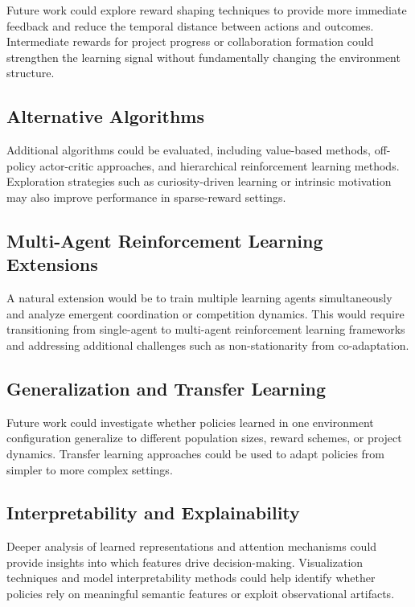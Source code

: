 \documentclass[english,bachelor]{hsluthesis}
\begin{document}
Future work could explore reward shaping techniques to provide more immediate feedback and reduce the temporal distance between actions and outcomes. Intermediate rewards for project progress or collaboration formation could strengthen the learning signal without fundamentally changing the environment structure.

\subsection{Alternative Algorithms}

Additional algorithms could be evaluated, including value-based methods, off-policy actor-critic approaches, and hierarchical reinforcement learning methods. Exploration strategies such as curiosity-driven learning or intrinsic motivation may also improve performance in sparse-reward settings.

\subsection{Multi-Agent Reinforcement Learning Extensions}

A natural extension would be to train multiple learning agents simultaneously and analyze emergent coordination or competition dynamics. This would require transitioning from single-agent to multi-agent reinforcement learning frameworks and addressing additional challenges such as non-stationarity from co-adaptation.

\subsection{Generalization and Transfer Learning}

Future work could investigate whether policies learned in one environment configuration generalize to different population sizes, reward schemes, or project dynamics. Transfer learning approaches could be used to adapt policies from simpler to more complex settings.

\subsection{Interpretability and Explainability}

Deeper analysis of learned representations and attention mechanisms could provide insights into which features drive decision-making. Visualization techniques and model interpretability methods could help identify whether policies rely on meaningful semantic features or exploit observational artifacts.
\end{document}
